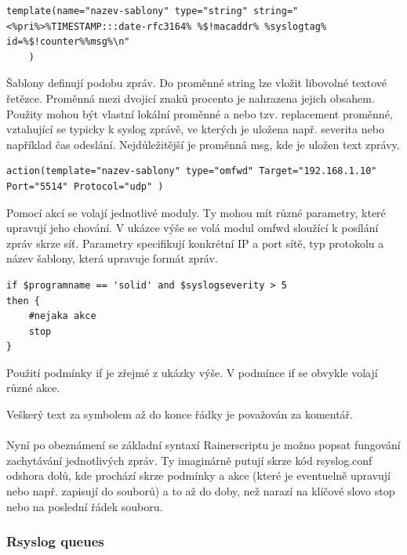 \documentclass[thesis=B,czech]{FITthesis}[2012/06/26]
\begin{document}
\begin{lstlisting}[style=RainerScriptSimpleStyle]
template(name="nazev-sablony" type="string" string="<%pri%>%TIMESTAMP:::date-rfc3164% %$!macaddr% %syslogtag% id=%$!counter%%msg%\n"
	)
\end{lstlisting}
Šablony definují podobu zpráv. Do proměnné string lze vložit libovolné textové řetězce. Proměnná mezi dvojicí znaků procento je nahrazena jejich obsahem. Použity mohou být vlastní lokální proměnné a nebo tzv. replacement proměnné, vztahující se typicky k syslog zprávě, ve kterých je uložena např. severita nebo například čas odeslání. Nejdůležitější je proměnná msg, kde je uložen text zprávy.

\begin{lstlisting}[style=RainerScriptSimpleStyle]
action(template="nazev-sablony" type="omfwd" Target="192.168.1.10" Port="5514" Protocol="udp" )
\end{lstlisting}

Pomocí akcí se volají jednotlivé moduly. Ty mohou mít různé parametry, které upravují jeho chování. V ukázce výše se volá modul omfwd sloužící k posílání zpráv skrze síť. Parametry specifikují konkrétní IP a port sítě, typ protokolu a název šablony, která upravuje formát zpráv.

\begin{lstlisting}[style=RainerScriptSimpleStyle]
if $programname == 'solid' and $syslogseverity > 5
then {
	#nejaka akce
	stop
}
\end{lstlisting}
	
Použití podmínky if je zřejmé z ukázky výše. V podmínce if se obvykle volají různé akce.

Veškerý text za symbolem \uv{\#} až do konce řádky je považován za komentář.
\\
\\
Nyní po obeznámení se základní syntaxí Rainerscriptu je možno popsat fungování zachytávání jednotlivých zpráv. Ty imaginárně putují skrze kód rsyslog.conf odshora dolů, kde prochází skrze podmínky a akce (které je eventuelně upravují nebo např. zapisují do souborů) a to až do doby, než narazí na klíčové slovo stop nebo na poslední řádek souboru.

\subsubsection*{Rsyslog queues}
\end{document}
